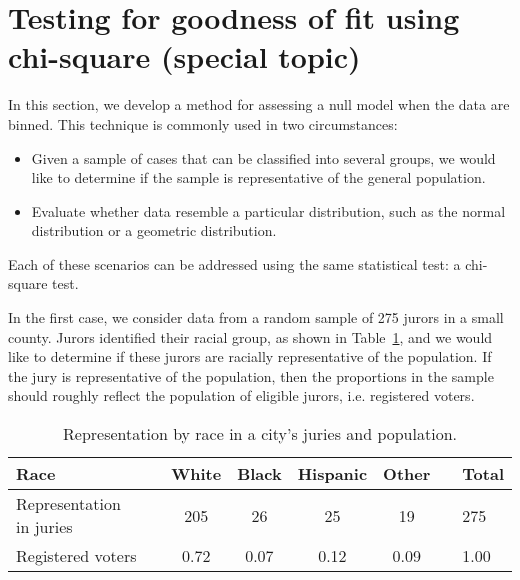 \section{Testing for goodness of fit using chi-square (special topic)}
\label{oneWayChiSquare}

In this section, we develop a method for assessing a null model when the data are binned.
This technique is commonly used in two circumstances:
\begin{itemize}
\setlength{\itemsep}{0mm}
\item Given a sample of cases that can be classified into several groups, we would like to determine if the sample is representative of the general population.
\item Evaluate whether data resemble a particular distribution, such as the normal distribution or a geometric distribution.
\end{itemize}
Each of these scenarios can be addressed using the same statistical test: a chi-square test.

In the first case, we consider data from a random sample of 275 jurors in a small county. Jurors identified their racial group, as shown in Table~\ref{juryRepresentationAndCityRepresentationForRace}, and we would like to determine if these jurors are racially representative of the population.  If the jury is representative of the population, then the proportions in the sample should roughly reflect the population of eligible jurors, i.e. registered voters.
\begin{table}[h]
\centering
\begin{tabular}{ll ccc c ll}
\hline
Race	 & \hspace{2mm} & White & Black & Hispanic & Other & \hspace{2mm} & Total \\
\hline
Representation in juries &	& 205 & 26 & 25 & 19 & & 275 \\
Registered voters	 & 		& 0.72 & 0.07 & 0.12 & 0.09 & & 1.00 \\
\hline
\end{tabular}
\vspace{-1.5mm}
\caption{Representation by race in a city's juries and population.}
\label{juryRepresentationAndCityRepresentationForRace}
\end{table}

